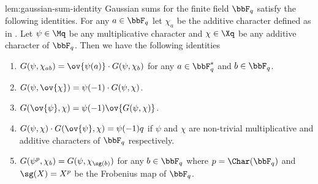 \begin{lemma}{}{lem:gaussian-sum-identity}
  Gaussian sums for the finite field $\bbF_q$ satisfy the following identities. For any $a\in \bbF_q$ let $\chi_a$ be the additive character defined as in . Let $\psi\in\Mq$ be any multiplicative character and $\chi\in\Xq$ be any additive character of $\bbF_q$.  Then we have the following identities\begin{enumerate}[label=(\roman*)]
    \item $G(\psi,\chi_{ab})=\ov{\psi(a)}\cdot G(\psi,\chi_b)$ for any $a\in \bbF_q^*$ and $b\in \bbF_q$.
    \item $G(\psi,\ov{\chi})=\psi(-1)\cdot G(\psi,\chi)$.
    \item $G(\ov{\psi},\chi)=\psi(-1)\ov{G(\psi,\chi)}$.
    \item $G(\psi,\chi)\cdot G(\ov{\psi},\chi)=\psi(-1)q$ if $\psi$ and $\chi$ are non-trivial multiplicative and additive characters of $\bbF_q$ respectively.
    \item $G(\psi^p,\chi_b)=G(\psi,\chi_{\sg(b)} )$ for any $b\in \bbF_q$ where $p=\Char(\bbF_q)$ and $\sg(X)=X^p$ be the Frobenius map of $\bbF_q$.
  \end{enumerate}
\end{lemma}
